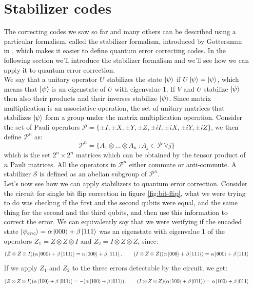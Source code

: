 \documentclass{article}
\begin{document}
	\section{Stabilizer codes}
	The correcting codes we saw so far and many others can be described using a particular formalism, called the stabilizer formalism, introduced by Gottersman in \cite{Gottesman1997StabilizerCA}, which makes it easier to define quantum error correcting codes. In the following section we'll introduce the stabilizer formalism and we'll see how we can apply it to quantum error correction.\\
	We say that a unitary operator $U$ stabilizes the state $\ket{\psi}$ if $U\ket{\psi} = \ket{\psi}$, which means that $\ket{\psi}$ is an eigenstate of $U$ with eigenvalue $1$. If $V$ and $U$ stabilize $\ket{\psi}$ then also their products and their inverses stabilize $\ket{\psi}$. Since matrix multiplication is an associative operation, the set of unitary matrices that stabilizes $\ket{\psi}$ form a group under the matrix multiplication operation. Consider the set of Pauli operators $\mathcal{P} = \{\pm I,\pm X,\pm Y,\pm Z, \pm iI,\pm iX,\pm iY,\pm iZ\}$, we then define $\mathcal{P}^n$ as:
	\[ \mathcal{P}^n = \{A_1\otimes \dots \otimes A_n\ \colon A_j \in \mathcal{P}\ \forall j\} \]
	which is the set $2^n\times2^n$ matrices which can be obtained by the tensor product of $n$ Pauli matrices. All the operators in $\mathcal{P}^n$ either commute or anti-commute. A stabilizer $\mathcal{S}$ is defined as an abelian subgroup of $\mathcal{P}^n$.\\
	Let's now see how we can apply stabilizers to quantum error correction. Consider the circuit for single bit flip correction in figure \ref{fig:bit-flip}, what we were trying to do was checking if the first and the second qubits were equal, and the same thing for the second and the third qubits, and then use this information to correct the error. We can equivalently say that we were verifying if the encoded state $\ket{\psi_{enc}} = \alpha\ket{000} + \beta\ket{111}$ was an eigenstate with eigenvalue 1 of the operators $Z_1 = Z\otimes Z \otimes I$ and $Z_2 = I \otimes Z \otimes Z$, since:
	\[(Z\otimes Z \otimes I)(\alpha\ket{000} + \beta\ket{111}) = \alpha\ket{000} + \beta\ket{111},\qquad (I\otimes Z \otimes Z)(\alpha\ket{000} + \beta\ket{111}) = \alpha\ket{000} + \beta\ket{111}\]
	If we apply $Z_1$ and $Z_2$  to the three errors detectable by the circuit, we get:
	\[(Z\otimes Z \otimes I)(\alpha\ket{100} + \beta\ket{011}) = -(\alpha\ket{100} + \beta\ket{011}),\qquad (I\otimes Z \otimes Z)(\alpha\ket{100} + \beta\ket{011}) = \alpha\ket{100} + \beta\ket{011}\]
\end{document}
